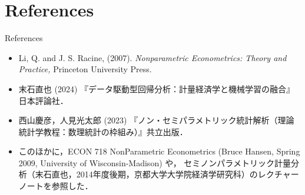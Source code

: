 \documentclass[xcolor=svgnames,dvipdfmx,cjk]{beamer}
\theoremstyle{example}
\begin{document}

\section{References}
\begin{frame}
  \tableofcontents[currentsection]
\end{frame}

\begin{frame}{References}
  \begin{itemize}
    \item Li, Q. and J. S. Racine, (2007). 
          \textit{Nonparametric Econometrics: Theory and Practice,} 
          Princeton University Press.
    \item 末石直也 (2024) 『データ駆動型回帰分析：計量経済学と機械学習の融合』日本評論社．
    \item 西山慶彦，人見光太郎 (2023) 『ノン・セミパラメトリック統計解析（理論統計学教程：数理統計の枠組み）』共立出版．
    \item このほかに，ECON 718 NonParametric Econometrics (Bruce Hansen, Spring 2009, University of Wisconsin-Madison) や，
          セミノンパラメトリック計量分析（末石直也，2014年度後期，京都大学大学院経済学研究科）のレクチャーノートを参照した． 
  \end{itemize}
\end{frame}
\end{document}
